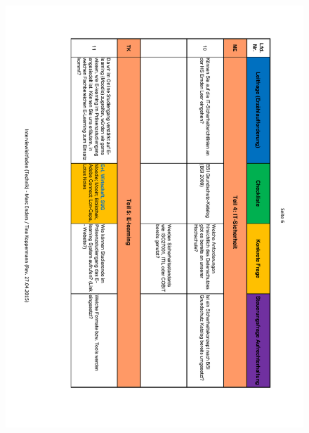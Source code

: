 \begin{figure}
	\centering
	\includegraphics[width=18cm]{kapitel/anhang/Interviewleitfaden_6}
\end{figure}

